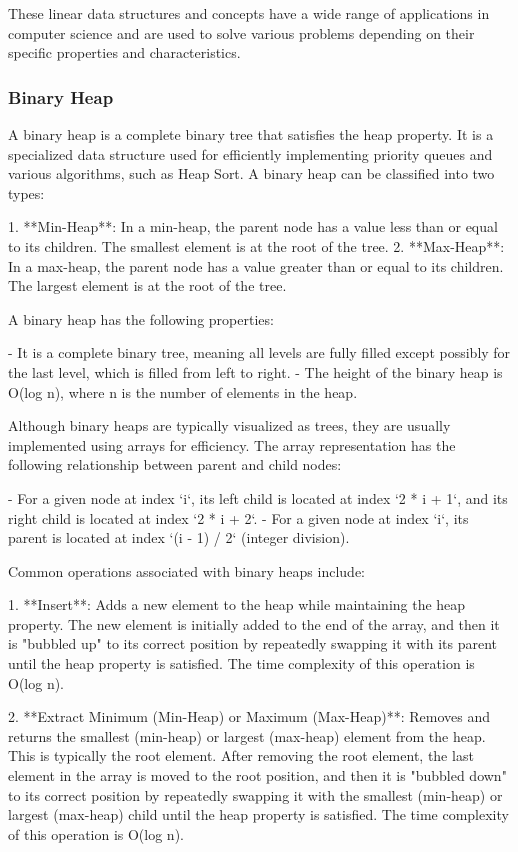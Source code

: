 \documentclass{article}
\begin{document}
These linear data structures and concepts have a wide range of applications in computer science and are used to solve various problems depending on their specific properties and characteristics.


\subsubsection{Binary Heap}

A binary heap is a complete binary tree that satisfies the heap property. It is a specialized data structure used for efficiently implementing priority queues and various algorithms, such as Heap Sort. A binary heap can be classified into two types:

1. **Min-Heap**: In a min-heap, the parent node has a value less than or equal to its children. The smallest element is at the root of the tree.
2. **Max-Heap**: In a max-heap, the parent node has a value greater than or equal to its children. The largest element is at the root of the tree.

A binary heap has the following properties:

- It is a complete binary tree, meaning all levels are fully filled except possibly for the last level, which is filled from left to right.
- The height of the binary heap is O(log n), where n is the number of elements in the heap.

Although binary heaps are typically visualized as trees, they are usually implemented using arrays for efficiency. The array representation has the following relationship between parent and child nodes:

- For a given node at index `i`, its left child is located at index `2 * i + 1`, and its right child is located at index `2 * i + 2`.
- For a given node at index `i`, its parent is located at index `(i - 1) / 2` (integer division).

Common operations associated with binary heaps include:

1. **Insert**: Adds a new element to the heap while maintaining the heap property. The new element is initially added to the end of the array, and then it is "bubbled up" to its correct position by repeatedly swapping it with its parent until the heap property is satisfied. The time complexity of this operation is O(log n).

2. **Extract Minimum (Min-Heap) or Maximum (Max-Heap)**: Removes and returns the smallest (min-heap) or largest (max-heap) element from the heap. This is typically the root element. After removing the root element, the last element in the array is moved to the root position, and then it is "bubbled down" to its correct position by repeatedly swapping it with the smallest (min-heap) or largest (max-heap) child until the heap property is satisfied. The time complexity of this operation is O(log n).
\end{document}
